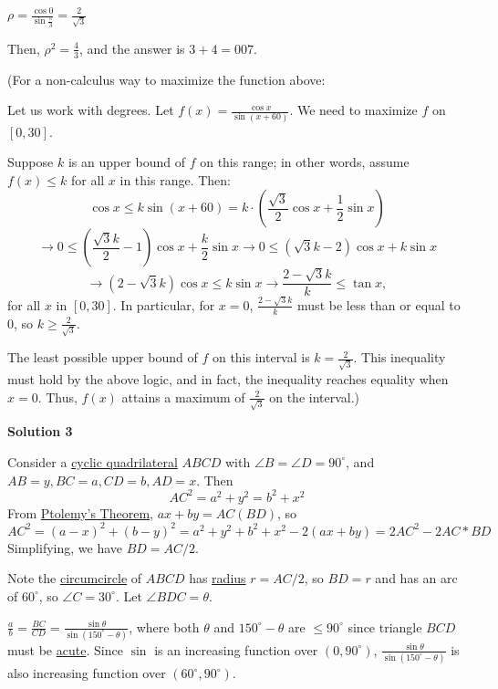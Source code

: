 \begin{enumerate}
 $\rho = \frac {\cos{0}}{\sin{\frac {\pi}{3}}} = \frac {2}{\sqrt {3}}$

 Then, $\rho^2 = \frac {4}{3}$, and the answer is $3+4=\boxed{007}$.

 (For a non-calculus way to maximize the function above:

 Let us work with degrees. Let $f(x)=\frac{\cos x}{\sin(x+60)}$. We need to maximize $f$ on $[0,30]$. 

 Suppose $k$ is an upper bound of $f$ on this range; in other words, assume $f(x)\le k$ for all $x$ in this range. Then: 
 \[\cos x\le k\sin(x+60)=k\cdot\left(\frac{\sqrt{3}}{2}\cos x+\frac{1}{2}\sin x\right)\]
 \[\rightarrow 0\le \left(\frac{\sqrt{3}k}{2}-1\right)\cos x+\frac{k}{2}\sin x\rightarrow 0\le (\sqrt{3}k-2)\cos x+k\sin x\]
 \[\rightarrow (2-\sqrt{3}k)\cos x\le k\sin x\rightarrow \frac{2-\sqrt{3}k}{k}\le \tan x,\]for all $x$ in $[0,30]$. In particular, for $x=0$, $\frac{2-\sqrt{3}k}{k}$ must be less than or equal to $0$, so $k\ge \frac{2}{\sqrt{3}}$.

 The least possible upper bound of $f$ on this interval is $k=\frac{2}{\sqrt{3}}$. This inequality must hold by the above logic, and in fact, the inequality reaches equality when $x=0$. Thus, $f(x)$ attains a maximum of $\frac{2}{\sqrt{3}}$ on the interval.)

 



\textbf{Solution 3}

Consider a \href{https://artofproblemsolving.com/wiki/index.php?title=Cyclic\_quadrilateral}{cyclic quadrilateral} $ABCD$ with $\angle B = \angle D = 90^{\circ}$, and $AB = y, BC = a, CD = b, AD = x$. Then
 \[AC^2 = a^2 + y^2 = b^2 + x^2\]From \href{https://artofproblemsolving.com/wiki/index.php?title=Ptolemy\%27s\_Theorem}{Ptolemy's Theorem}, $ax + by = AC(BD)$, so
 \[AC^2 = (a - x)^2 + (b - y)^2 = a^2 + y^2 + b^2 + x^2 - 2(ax + by) = 2AC^2 - 2AC*BD\]Simplifying, we have $BD = AC/2$. 

 Note the \href{https://artofproblemsolving.com/wiki/index.php?title=Circumcircle}{circumcircle} of $ABCD$ has \href{https://artofproblemsolving.com/wiki/index.php?title=Radius}{radius} $r = AC/2$, so $BD = r$ and has an arc of $60^{\circ}$, so $\angle C = 30^{\circ}$. Let $\angle BDC = \theta$.

 $\frac ab = \frac{BC}{CD} = \frac{\sin \theta}{\sin(150^{\circ} - \theta)}$, where both $\theta$ and $150^{\circ} - \theta$ are $\leq 90^{\circ}$ since triangle $BCD$ must be \href{https://artofproblemsolving.com/wiki/index.php?title=Acute\_triangle}{acute}. Since $\sin$ is an increasing function over $(0, 90^{\circ})$, $\frac{\sin \theta}{\sin(150^{\circ} - \theta)}$ is also increasing function over $(60^{\circ}, 90^{\circ})$.


\end{enumerate}
